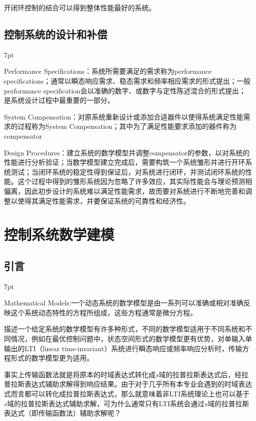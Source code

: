 \documentclass{article}
\numberwithin{equation}{section}
\numberwithin{figure}{section}
\newenvironment{formal}{%
\def\FrameCommand{%
\hspace{1pt}%
{\color{DarkBlue}\vrule width 2pt}%
{\color{formalshade}\vrule width 4pt}%
\colorbox{formalshade}%
}%
\MakeFramed{\advance\hsize-\width\FrameRestore}%
\noindent\hspace{-4.55pt}%
\begin{adjustwidth}{}{7pt}%
\vspace{2pt}\vspace{2pt}%
}
{%
\vspace{2pt}\end{adjustwidth}\endMakeFramed%
}
\begin{document}
开闭环控制的结合可以得到整体性能最好的系统。

\subsection{控制系统的设计和补偿}
\begin{formal}
    \item Performance Specifications：系统所需要满足的需求称为performance specifications；通常以瞬态响应需求、稳态需求和频率相应需求的形式提出；一般performance specification会以准确的数字、或数字与定性陈述混合的形式提出；是系统设计过程中最重要的一部分。
    \item System Compensation：对原系统重新设计或添加合适器件以使得系统满足性能需求的过程称为System Compensation；其中为了满足性能要求添加的器件称为compensator
    \item Design Procedures：建立系统的数学模型并调整compensator的参数，以对系统的性能进行分析验证；当数学模型建立完成后，需要构筑一个系统雏形并进行开环系统测试；当闭环系统的稳定性得到保证后，对系统进行闭环，并测试闭环系统的性能。这个过程中得到的雏形系统因为忽略了许多效应，其实际性能会与理论预测相偏离，因此初步设计的系统难以满足性能需求，故而要对系统进行不断地完善和调整以使得其满足性能需求，并要保证系统的可靠性和经济性。
    \item 
\end{formal}

\newpage

\section{控制系统数学建模}
\subsection{引言}
\begin{formal}
    Mathematical Models:一个动态系统的数学模型是由一系列可以准确或相对准确反映这个系统动态特性的方程所组成，这些方程通常是微分方程。
\end{formal}
描述一个给定系统的数学模型有许多种形式，不同的数学模型适用于不同系统和不同情况，例如在最优控制问题中，状态空间形式的数学模型更有优势，对单输入单输出的LTI（linear time-invariant）系统进行瞬态响应或频率响应分析时，传输方程形式的数学模型更为适用。

事实上传输函数法就是将原本的时域表达式转化成$s$域的拉普拉斯表达式后，经拉普拉斯表达式辅助求解得到响应结果。由于对于几乎所有本专业会遇到的时域表达式而言都可以转化成拉普拉斯表达式，那么就意味着非LTI系统理论上也可以基于$s$域的拉普拉斯表达式辅助求解，可为什么通常只有LTI系统会通过$s$域的拉普拉斯表达式（即传输函数法）辅助求解呢？
\end{document}

